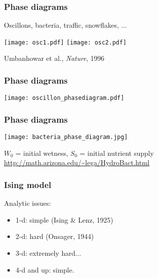 \begin{frame}
  \frametitle{Phase diagrams}

  Oscillons, bacteria, traffic, snowflakes, ...

  \medskip
  
  \texttt{[image: osc1.pdf]}
  \texttt{[image: osc2.pdf]}

  \medskip

  Umbanhowar et al., \textit{Nature}, 1996\cite{umbanhowar1996a}

\end{frame}

\begin{frame}
  \frametitle{Phase diagrams}

  \begin{center}
    \texttt{[image: oscillon\_phasediagram.pdf]}
  \end{center}

\end{frame}

\begin{frame}
  \frametitle{Phase diagrams}

  \begin{center}
    \texttt{[image: bacteria\_phase\_diagram.jpg]}
  \end{center}

  {\tiny $W_0$ = initial wetness, $S_0$ = initial nutrient supply\\
    \url{http://math.arizona.edu/~lega/HydroBact.html}}

\end{frame}

\begin{frame}
  \frametitle{Ising model}

  \begin{block}{Analytic issues:}
    \begin{itemize}
    \item<1-> 1-d: simple (Ising \& Lenz, 1925)
    \item<2-> 2-d: hard (Onsager, 1944)
    \item<3-> 3-d: extremely hard...
    \item<4-> 4-d and up: simple.
    \end{itemize}
  \end{block}

\end{frame}

